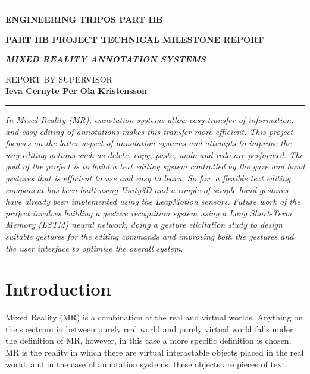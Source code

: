 \documentclass[a4paper, 12pt]{article}
\begin{document}
\noindent
\rule{\textwidth}{0.5mm}
\begin{center}
{\bf ENGINEERING TRIPOS PART IIB}
\end{center}
\vspace{0.5cm} {\bf PART IIB PROJECT \hfill TECHNICAL MILESTONE REPORT}
\vspace{0.5cm}
\begin{center}
{\bf \LARGE \textit{MIXED REALITY ANNOTATION SYSTEMS} \\}
\end{center}
REPORT BY \hfill SUPERVISOR \\
{\bf Ieva Cernyte \hfill Per Ola Kristensson \\}
\rule{\textwidth}{0.5mm}

\begin{center}
\end{center}
\vspace{-0.25cm}

\textit{In Mixed Reality (MR), annotation systems allow easy transfer of information, and easy editing of annotations makes this transfer more efficient. This project focuses on the latter aspect of annotation systems and attempts to improve the way editing actions such as delete, copy, paste, undo and redo are performed. The goal of the project is to build a text editing system controlled by the gaze and hand gestures that is efficient to use and easy to learn. So far, a flexible text editing component has been built using Unity3D and a couple of simple hand gestures have already been implemented using the LeapMotion sensors. Future work of the project involves building a gesture recognition system using a Long Short-Term Memory (LSTM) neural network, doing a gesture elicitation study to design suitable gestures for the editing commands and improving both the gestures and the user interface to optimise the overall system.} 


\section{Introduction}

Mixed Reality (MR) is a combination of the real and virtual worlds. Anything on the spectrum in between purely real world and purely virtual world falls under the definition of MR, however, in this case a more specific definition is chosen. MR is the reality in which there are virtual interactable objects placed in the real world, and in the case of annotation systems, these objects are pieces of text.
\end{document}
